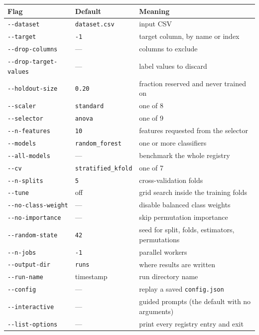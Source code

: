 \documentclass[11pt,a4paper]{article}
\begin{document}
\begin{center}
\small
\begin{tabularx}{\textwidth}{L{4.6cm} L{2.9cm} X}
\toprule
\textbf{Flag} & \textbf{Default} & \textbf{Meaning} \\
\midrule
\texttt{-{}-dataset} & \texttt{dataset.csv} & input CSV \\
\texttt{-{}-target} & \texttt{-1} & target column, by name or index \\
\texttt{-{}-drop-columns} & --- & columns to exclude \\
\texttt{-{}-drop-target-values} & --- & label values to discard \\
\texttt{-{}-holdout-size} & \texttt{0.20} & fraction reserved and never trained on \\
\texttt{-{}-scaler} & \texttt{standard} & one of 8 \\
\texttt{-{}-selector} & \texttt{anova} & one of 9 \\
\texttt{-{}-n-features} & \texttt{10} & features requested from the selector \\
\texttt{-{}-models} & \texttt{random\_forest} & one or more classifiers \\
\texttt{-{}-all-models} & --- & benchmark the whole registry \\
\texttt{-{}-cv} & \texttt{stratified\_kfold} & one of 7 \\
\texttt{-{}-n-splits} & \texttt{5} & cross-validation folds \\
\texttt{-{}-tune} & off & grid search inside the training folds \\
\texttt{-{}-no-class-weight} & --- & disable balanced class weights \\
\texttt{-{}-no-importance} & --- & skip permutation importance \\
\texttt{-{}-random-state} & \texttt{42} & seed for split, folds, estimators, permutations \\
\texttt{-{}-n-jobs} & \texttt{-1} & parallel workers \\
\texttt{-{}-output-dir} & \texttt{runs} & where results are written \\
\texttt{-{}-run-name} & timestamp & run directory name \\
\texttt{-{}-config} & --- & replay a saved \texttt{config.json} \\
\texttt{-{}-interactive} & --- & guided prompts (the default with no arguments) \\
\texttt{-{}-list-options} & --- & print every registry entry and exit \\
\bottomrule
\end{tabularx}
\end{center}
\end{document}
